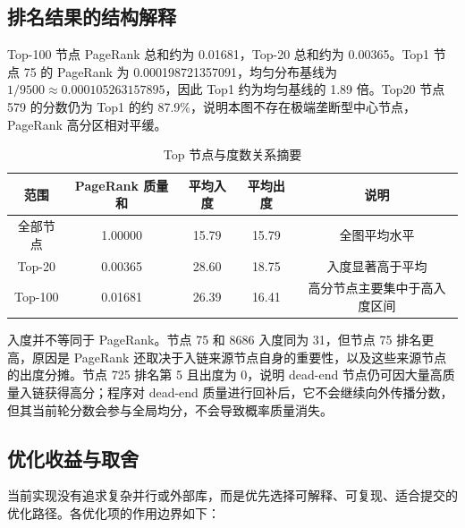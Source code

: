 \documentclass[UTF8,a4paper,10pt]{ctexart}
\begin{document}
\subsection{排名结果的结构解释}

Top-100 节点 PageRank 总和约为 0.01681，Top-20 总和约为 0.00365。Top1 节点 75 的 PageRank 为 0.000198721357091，均匀分布基线为 $1/9500\approx0.000105263157895$，因此 Top1 约为均匀基线的 1.89 倍。Top20 节点 579 的分数仍为 Top1 的约 87.9\%，说明本图不存在极端垄断型中心节点，PageRank 高分区相对平缓。

\begin{table}[H]
  \centering
  \caption{Top 节点与度数关系摘要}
  \small
  \begin{tabular}{c c c c c}
    \toprule
    \textbf{范围} & \textbf{PageRank 质量和} & \textbf{平均入度} & \textbf{平均出度} & \textbf{说明} \\
    \midrule
    全部节点 & 1.00000 & 15.79 & 15.79 & 全图平均水平 \\
    Top-20 & 0.00365 & 28.60 & 18.75 & 入度显著高于平均 \\
    Top-100 & 0.01681 & 26.39 & 16.41 & 高分节点主要集中于高入度区间 \\
    \bottomrule
  \end{tabular}
\end{table}

入度并不等同于 PageRank。节点 75 和 8686 入度同为 31，但节点 75 排名更高，原因是 PageRank 还取决于入链来源节点自身的重要性，以及这些来源节点的出度分摊。节点 725 排名第 5 且出度为 0，说明 dead-end 节点仍可因大量高质量入链获得高分；程序对 dead-end 质量进行回补后，它不会继续向外传播分数，但其当前轮分数会参与全局均分，不会导致概率质量消失。

\subsection{优化收益与取舍}

当前实现没有追求复杂并行或外部库，而是优先选择可解释、可复现、适合提交的优化路径。各优化项的作用边界如下：
\end{document}
